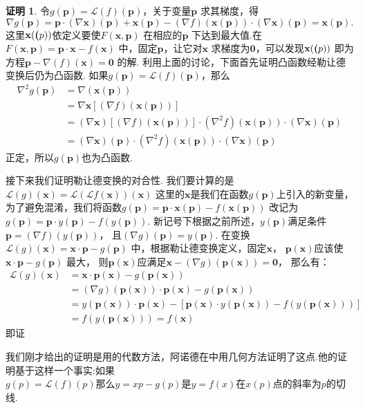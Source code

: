 \documentclass[UTF8,10.5pt,a4paper]{ctexart}
\numberwithin{equation}{section}
\theoremstyle{definition}
\theoremstyle{definition}
\newtheorem*{pf}{证明}
\begin{document}
\begin{pf}
令$g(\textbf{p})=\mathcal{L}(f)(\textbf{p})$，关于变量$\textbf{p}$ 求其梯度，得
$$\nabla g(\textbf{p})=\textbf{p}\cdot (\nabla \textbf{x})(\textbf{p})+\textbf{x}(\textbf{p})-(\nabla f)(\textbf{x}(\textbf{p}))\cdot (\nabla \textbf{x})(\textbf{p})=\textbf{x}(\textbf{p}).$$
这里$\textbf{x}(\textbf(p))$依定义要使$F(\textbf{x},\textbf{p})$ 在相应的$\textbf{p}$ 下达到最大值.在$F(\textbf{x},\textbf{p})=\textbf{p}\cdot \textbf{x}-f(\textbf{x})$ 中，固定$\textbf{p}$，让它对$\textbf{x}$ 求梯度为$\textbf{0}$，可以发现$\textbf{x}(\textbf(p))$ 即为方程$\textbf{p}-\nabla (f)(\textbf{x})=\textbf{0}$ 的解.
利用上面的讨论，下面首先证明凸函数经勒让德变换后仍为凸函数.
如果$g(\textbf{p})=\mathcal{L}(f)(\textbf{p})$，那么
\begin{align*}
\nabla^2g(\textbf{p})&=\nabla(\textbf{x}(\textbf{p}))\\
&=\nabla{\textbf{x}[(\nabla f)(\textbf{x}(\textbf{p}))]}\\
&=(\nabla \textbf{x})[(\nabla f)(\textbf{x}(\textbf{p}))]\cdot(\nabla^2 f)(\textbf{x}(\textbf{p}))\cdot(\nabla \textbf{x})(\textbf{p})\\
&=(\nabla \textbf{x})(\textbf{p})\cdot (\nabla^2 f)(\textbf{x}(\textbf{p}))\cdot(\nabla \textbf{x})(\textbf{p})
\end{align*}
正定，所以$g(\textbf{p})$也为凸函数.\\
\par 接下来我们证明勒让德变换的对合性.
我们要计算的是$\mathcal{L}(g)(\textbf{x})=\mathcal{L}(\mathcal{L}f(\textbf{x}))(\textbf{x})$ 这里的$\textbf{x}$是我们在函数$g(\textbf{p})$上引入的新变量，
为了避免混淆，我们将函数$g(\textbf{p})=\textbf{p}\cdot \textbf{x}(\textbf{p})-f(\textbf{x}(\textbf{p}))$ 改记为
$g(\textbf{p})=\textbf{p}\cdot y(\textbf{p})-f(y(\textbf{p}))$.
新记号下根据之前所述，$y(\textbf{p})$满足条件$\textbf{p}=(\nabla f)(y(\textbf{p}))$，
且$(\nabla g)(\textbf{p})=y(\textbf{p})$.
在变换$\mathcal{L}(g)(\textbf{x})=\textbf{x}\cdot \textbf{p}-g(\textbf{p})$ 中，根据勒让德变换定义，固定$\textbf{x}$，
$\textbf{p}(\textbf{x})$应该使$\textbf{x}\cdot \textbf{p}-g(\textbf{p})$ 最大，
则$\textbf{p}(\textbf{x})$应满足$\textbf{x}-(\nabla g)(\textbf{p}(\textbf{x}))=\mathbf{0}$，
那么有：
\begin{align*}
\mathcal{L}(g)(\textbf{x})&=\textbf{x}\cdot \textbf{p}(\textbf{x})-g(\textbf{p}(\textbf{x}))\\
&=(\nabla g)(\textbf{p}(\textbf{x}))\cdot \textbf{p}(\textbf{x})-g(\textbf{p}(\textbf{x}))\\
&=y(\textbf{p}(\textbf{x}))\cdot \textbf{p}(\textbf{x})-[\textbf{p}(\textbf{x})\cdot y(\textbf{p}(\textbf{x}))-f(y(\textbf{p}(\textbf{x})))]\\
&=f(y(\textbf{p}(\textbf{x})))=f(\textbf{x})
\end{align*}
即证
\end{pf}
我们刚才给出的证明是用的代数方法，阿诺德在\cite{AI4}中用几何方法证明了这点.他的证明基于这样一个事实:如果$g(p)=\mathcal{L}(f)(p)\text{那么}y=xp-g(p)\text{是}y=f(x)\text{在}x(p)\text{点}\text{的斜率为}p$的切线.
\end{document}
